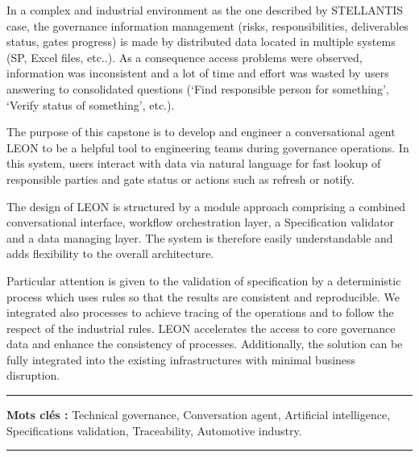
In a complex and industrial environment as the one described by STELLANTIS case, the governance information management (risks, responsibilities, deliverables status, gates progress) is made by distributed data located in multiple systems (SP, Excel files, etc..). As a consequence access problems were observed, information was inconsistent and a lot of time and effort was wasted by users answering to consolidated questions (‘Find responsible person for something’, ‘Verify status of something’, etc.).
\medskip

The purpose of this capstone is to develop and engineer a conversational agent LEON to be a helpful tool to engineering teams during governance operations. In this system, users interact with data via natural language for fast lookup of responsible parties and gate status or actions such as refresh or notify.
\medskip

The design of LEON is structured by a module approach comprising a combined conversational interface, workflow orchestration layer, a Specification validator and a data managing layer. The system is therefore easily understandable and adds flexibility to the overall architecture.
\medskip

Particular attention is given to the validation of specification by a deterministic process which uses rules so that the results are consistent and reproducible. We integrated also processes to achieve tracing of the operations and to follow the respect of the industrial rules.
\medskip
LEON accelerates the access to core governance data and enhance the consistency of processes. Additionally, the solution can be fully integrated into the existing infrastructures with minimal business disruption.
\vspace{1cm}


\noindent\rule[2pt]{\textwidth}{0.5pt}

{\textbf{Mots clés :}}
Technical governance, Conversation agent, Artificial intelligence, Specifications validation, Traceability, Automotive industry.\\
\noindent\rule[2pt]{\textwidth}{0.5pt}
